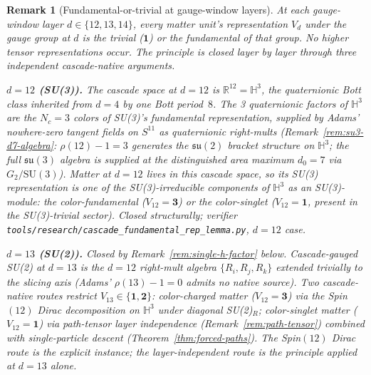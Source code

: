 \documentclass[12pt,a4paper]{article}
\newtheorem{remark}[theorem]{Remark}
\begin{document}
\begin{remark}[Fundamental-or-trivial at gauge-window layers]\label{rem:fund-or-trivial}
At each gauge-window layer $d\in\{12,13,14\}$, every matter unit's
representation $V_d$ under the gauge group at $d$ is the trivial
($\mathbf{1}$) or the fundamental of that group. No higher tensor
representations occur. The principle is closed layer by layer through
three independent cascade-native arguments.

\medskip\noindent\textbf{$d=12$ (SU(3)).}
The cascade space at $d=12$ is $\mathbb{R}^{12}=\mathbb{H}^3$, the
quaternionic Bott class inherited from $d=4$ by one Bott period~$8$.
The 3 quaternionic factors of $\mathbb{H}^3$ are the $N_c=3$ colors of
SU(3)'s fundamental representation, supplied by Adams' nowhere-zero
tangent fields on $S^{11}$ as quaternionic right-mults
(Remark~\ref{rem:su3-d7-algebra}: $\rho(12)-1=3$ generates the
$\mathfrak{su}(2)$ bracket structure on $\mathbb{H}^3$; the full
$\mathfrak{su}(3)$ algebra is supplied at the distinguished area
maximum $d_0=7$ via $G_2/\mathrm{SU}(3)$). Matter at $d=12$ lives in
this cascade space, so its SU(3) representation is one of the
SU(3)-irreducible components of $\mathbb{H}^3$ as an SU(3)-module: the
color-fundamental ($V_{12}=\mathbf{3}$) or the color-singlet
($V_{12}=\mathbf{1}$, present in the SU(3)-trivial sector). Closed
structurally; verifier
\texttt{tools/research/cascade\_fundamental\_rep\_lemma.py}, $d=12$
case.

\medskip\noindent\textbf{$d=13$ (SU(2)).}
Closed by Remark~\ref{rem:single-h-factor} below. Cascade-gauged
SU(2) at $d=13$ is the $d=12$ right-mult algebra $\{R_i,R_j,R_k\}$
extended trivially to the slicing axis (Adams' $\rho(13)-1=0$ admits
no native source). Two cascade-native routes restrict $V_{13}\in
\{\mathbf{1},\mathbf{2}\}$: color-charged matter
($V_{12}=\mathbf{3}$) via the Spin$(12)$ Dirac decomposition on
$\mathbb{H}^3$ under diagonal SU(2)$_R$; color-singlet matter
($V_{12}=\mathbf{1}$) via path-tensor layer independence
(Remark~\ref{rem:path-tensor}) combined with single-particle
descent (Theorem~\ref{thm:forced-paths}). The Spin$(12)$ Dirac route
is the explicit instance; the layer-independent route is the principle
applied at $d=13$ alone.


\end{remark}
\end{document}
